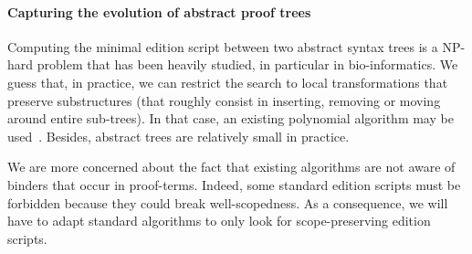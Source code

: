 \documentclass{article}
\begin{document}
\paragraph{Capturing the evolution of abstract proof trees}
\-

Computing the minimal edition script between two abstract syntax trees
is a NP-hard problem that has been heavily studied, in particular in
bio-informatics.  We guess that, in practice, we can restrict the
search to local transformations that preserve substructures (that
roughly consist in inserting, removing or moving around entire
sub-trees). In that case, an existing polynomial algorithm may be
used~\cite{Touzet05alinear}. Besides, abstract trees are relatively small in
practice. 

We are more concerned about the fact that existing algorithms are not
aware of binders that occur in proof-terms. Indeed, some standard
edition scripts must be forbidden because they could break
well-scopedness. As a consequence, we will have to adapt standard
algorithms to only look for scope-preserving edition scripts.

\end{document}
